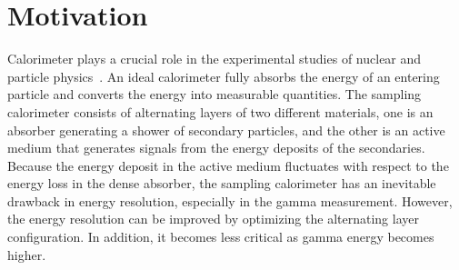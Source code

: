 \documentclass[12pt,times,draftclsnofoot,a4paper]{elsarticle}
\begin{document}
\linenumbers

\section{Motivation}
\label{sec:mot}

Calorimeter plays a crucial role in the experimental studies of nuclear and particle physics~\cite{unitext}. An ideal calorimeter fully absorbs the energy of an entering particle and converts the energy into measurable quantities. The sampling calorimeter consists of alternating layers of two different materials, one is an absorber generating a shower of secondary particles, and the other is an active medium that generates signals from the energy deposits of the secondaries. Because the energy deposit in the active medium fluctuates with respect to the energy loss in the dense absorber, the sampling calorimeter has an inevitable drawback in energy resolution, especially in the gamma measurement. However, the energy resolution can be improved by optimizing the alternating layer configuration.  In addition, it becomes less critical as gamma energy becomes higher.
\end{document}
